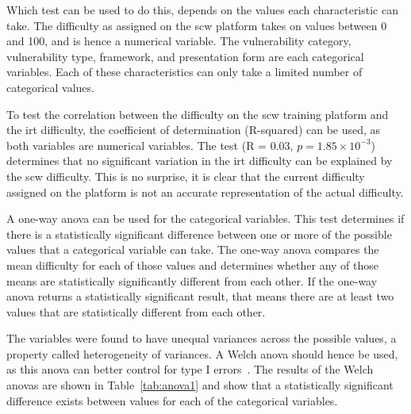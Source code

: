 Which test can be used to do this, depends on the values each characteristic can take.
The difficulty as assigned on the \gls{scw} platform takes on values between 0 and 100, and is hence a numerical variable.
The vulnerability category, vulnerability type, framework, and presentation form are each categorical variables.
Each of these characteristics can only take a limited number of categorical values.

To test the correlation between the difficulty on the \gls{scw} training platform and the \gls{irt} difficulty, the coefficient of determination (R-squared) can be used, as both variables are numerical variables.
The test (R = 0.03, $p = 1.85 \times 10^{-3}$) determines that no significant variation in the \gls{irt} difficulty can be explained by the \gls{scw} difficulty.
This is no surprise, it is clear that the current difficulty assigned on the platform is not an accurate representation of the actual difficulty.

A one-way \gls{anova} can be used for the categorical variables.
This test determines if there is a statistically significant difference between one or more of the possible values that a categorical variable can take.
The one-way \gls{anova} compares the mean difficulty for each of those values and determines whether any of those means are statistically significantly different from each other.
If the one-way \gls{anova} returns a statistically significant result, that means there are at least two values that are statistically different from each other.

The variables were found to have unequal variances across the possible values, a property called heterogeneity of variances.
A Welch \gls{anova} should hence be used, as this \gls{anova} can better control for type I errors~\cite{liu2015comparing}.
The results of the Welch \glspl{anova} are shown in Table~\ref{tab:anova1} and show that a statistically significant difference exists between values for each of the categorical variables.

